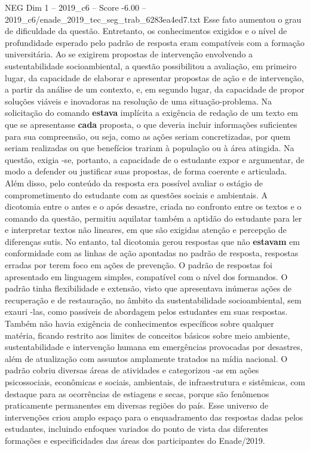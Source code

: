 \begin{textsample}{NEG Dim 1 – 2019\_c6 – Score -6.00 – 2019\_c6/enade\_2019\_tec\_seg\_trab\_6283ea4ed7.txt}
Esse fato aumentou o grau de dificuldade da questão.
Entretanto, os conhecimentos exigidos e o nível de profundidade esperado pelo padrão de resposta eram compatíveis com a formação universitária.
Ao se exigirem propostas de intervenção envolvendo a sustentabilidade socioambiental, a questão possibilitou a avaliação, em primeiro lugar, da capacidade de elaborar e apresentar propostas de ação e de intervenção, a partir da análise de um contexto, e, em segundo lugar, da capacidade de propor soluções viáveis e inovadoras na resolução de uma situação-problema.
Na solicitação do comando \textbf{estava} implícita a exigência de redação de um texto em que se apresentasse \textbf{cada} proposta, o que deveria incluir informações suficientes para sua compreensão, ou seja, como as ações seriam concretizadas, por quem seriam realizadas ou que benefícios trariam à população ou à área atingida.
Na questão, exigia -se, portanto, a capacidade de o estudante expor e argumentar, de modo a defender ou justificar suas propostas, de forma coerente e articulada.
Além disso, pelo conteúdo da resposta era possível avaliar o estágio de comprometimento do estudante com as questões sociais e ambientais.
A dicotomia entre o antes e o após desastre, criada no confronto entre os textos e o comando da questão, permitiu aquilatar também a aptidão do estudante para ler e interpretar textos não lineares, em que são exigidas atenção e percepção de diferenças sutis.
No entanto, tal dicotomia gerou respostas que não \textbf{estavam} em conformidade com as linhas de ação apontadas no padrão de resposta, respostas erradas por terem foco em ações de prevenção.
O padrão de respostas foi apresentado em linguagem simples, compatível com o nível dos formandos.
O padrão tinha flexibilidade e extensão, visto que apresentava inúmeras ações de recuperação e de restauração, no âmbito da sustentabilidade socioambiental, sem exauri -las, como passíveis de abordagem pelos estudantes em suas respostas.
Também não havia exigência de conhecimentos específicos sobre qualquer matéria, ficando restrito aos limites de conceitos básicos sobre meio ambiente, sustentabilidade e intervenção humana em emergências provocadas por desastres, além de atualização com assuntos amplamente tratados na mídia nacional.
O padrão cobriu diversas áreas de atividades e categorizou -as em ações psicossociais, econômicas e sociais, ambientais, de infraestrutura e sistêmicas, com destaque para as ocorrências de estiagens e secas, porque são fenômenos praticamente permanentes em diversas regiões do país.
Esse universo de intervenções criou amplo espaço para o enquadramento das respostas dadas pelos estudantes, incluindo enfoques variados do ponto de vista das diferentes formações e especificidades das áreas dos participantes do Enade/2019.

\end{textsample}
